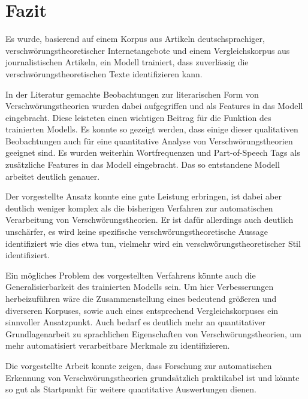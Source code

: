 \section{Fazit}

Es wurde, basierend auf einem Korpus aus Artikeln deutschsprachiger, verschwörungstheoretischer Internetangebote und einem Vergleichskorpus aus journalistischen Artikeln, ein Modell trainiert, dass zuverlässig die verschwörungstheoretischen Texte identifizieren kann.

In der Literatur gemachte Beobachtungen zur literarischen Form von Verschwörungstheorien wurden dabei aufgegriffen und als Features in das Modell eingebracht.
Diese leisteten einen wichtigen Beitrag für die Funktion des trainierten Modells.
Es konnte so gezeigt werden, dass einige dieser qualitativen Beobachtungen auch für eine quantitative Analyse von Verschwörungstheorien geeignet sind.
Es wurden weiterhin Wortfrequenzen und Part-of-Speech Tags als zusätzliche Features in das Modell eingebracht.
Das so entstandene Modell arbeitet deutlich genauer.

Der vorgestellte Ansatz konnte eine gute Leistung erbringen, ist dabei aber deutlich weniger komplex als die bisherigen Verfahren zur automatischen Verarbeitung von Verschwörungstheorien.
Er ist dafür allerdings auch deutlich unschärfer, es wird keine spezifische verschwörungstheoretische Aussage identifiziert wie dies etwa \textcite[]{samory_2018} tun, vielmehr wird ein verschwörungstheoretischer Stil identifiziert.

Ein mögliches Problem des vorgestellten Verfahrens könnte auch die Generalisierbarkeit des trainierten Modells sein.
Um hier Verbesserungen herbeizuführen wäre die Zusammenstellung eines bedeutend größeren und diverseren Korpuses, sowie auch eines entsprechend Vergleichskorpuses ein sinnvoller Ansatzpunkt.
Auch bedarf es deutlich mehr an quantitativer Grundlagenarbeit zu sprachlichen Eigenschaften von Verschwörungstheorien, um mehr automatisiert verarbeitbare Merkmale zu identifizieren.

Die vorgestellte Arbeit konnte zeigen, dass Forschung zur automatischen Erkennung von Verschwörungstheorien grundsätzlich praktikabel ist und könnte so gut als Startpunkt für weitere quantitative Auswertungen dienen.